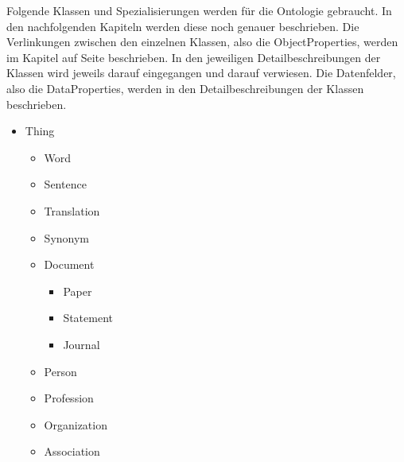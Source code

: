 \documentclass[
    11pt,
    latin1,
    a4paper,
    oneside
]{scrreprt}
\begin{document}
Folgende Klassen und Spezialisierungen werden f\"ur die Ontologie gebraucht. In den nachfolgenden Kapiteln werden diese noch genauer beschrieben. Die Verlinkungen zwischen den einzelnen Klassen, also die ObjectProperties, werden im Kapitel  auf Seite \pageref{sec:relations} beschrieben. In den jeweiligen Detailbeschreibungen der Klassen wird jeweils darauf eingegangen und darauf verwiesen. Die Datenfelder, also die DataProperties, werden in den Detailbeschreibungen der Klassen beschrieben.

\begin{itemize}
  \renewcommand{\labelitemi}{$\bullet$}
  \renewcommand{\labelitemii}{$\bullet$}
  \renewcommand{\labelitemiii}{$\bullet$}
  \renewcommand{\labelitemiiii}{$\bullet$}
  \item Thing
  \begin{itemize}
    \item Word
    \item Sentence
    \item Translation
    \item Synonym
    \item Document
    \begin{itemize}
      \item Paper
      \item Statement
      \item Journal
    \end{itemize}
    \item Person
    \item Profession
    \item Organization
    \item Association
  \end{itemize}
\end{itemize}
\end{document}
